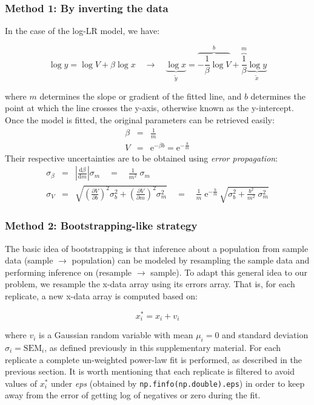 \subsubsection*{Method 1: By inverting the data}

In the case of the log-LR model, we have:
\begin{linenomath}
$$\log y = \log V + \beta\log x \quad\rightarrow\quad \underbrace{\log x}_{\tilde y} = \overbrace{-\frac{1}{\beta}\log V}^{b} + \overbrace{\frac{1}{\beta}}^{m}\underbrace{\log y}_{\tilde x}$$ 
\end{linenomath}
where $m$ determines the slope or gradient of the fitted line, and $b$ determines the point at which the line crosses the y-axis, otherwise known as the y-intercept. Once the model is fitted, the original parameters can be retrieved easily:
\begin{eqnarray*}
\beta &=& \frac{1}{m} \\
V &=& \mathrm{e}^{-\beta b} = \mathrm{e}^{-\frac{b}{m}}
\end{eqnarray*}
Their respective uncertainties are to be obtained using \emph{error propagation}:
\begin{eqnarray*}
    \sigma_\beta &=& \left|\frac{\mathrm{d}\beta}{\mathrm{d}m}\right|\sigma_m \quad=\quad \frac{1}{m^2}\;\sigma_m \\
    \sigma_V &=& \sqrt{\left(\frac{\partial V}{\partial b}\right)^{\!\!2}\sigma_b^2 +
      \left(\frac{\partial V}{\partial m}\right)^{\!\!2}\sigma_m^2} \quad=\quad
      \frac{1}{m}\;\mathrm{e}^{-\frac{b}{m}}\,\sqrt{\sigma_b^2 + \frac{b^2}{m^2}\;\sigma_m^2} 
\end{eqnarray*}

\subsubsection*{Method 2: Bootstrapping-like strategy}

The basic idea of bootstrapping is that inference about a population from sample data (sample $\rightarrow$ population) can be modeled by resampling the sample data and performing inference on (resample $\rightarrow$ sample). To adapt this general idea to our problem, we resample the x-data array using its errors array. That is, for each replicate, a new x-data array is computed based on:
\begin{linenomath}
$$x^*_i = x_i + v_i$$
\end{linenomath}
where $v_i$ is a Gaussian random variable with mean $\mu_i=0$ and standard deviation $\sigma_i=\mathrm{SEM}_i$, as defined previously in this supplementary material. For each replicate a complete un-weighted power-law fit is performed, as described in the previous section. It is worth mentioning that each replicate is filtered to avoid values of $x^*_i$ under \emph{eps} (obtained by \texttt{np.finfo(np.double).eps}) in order to keep away from the error of getting log of negatives or zero during the fit.

